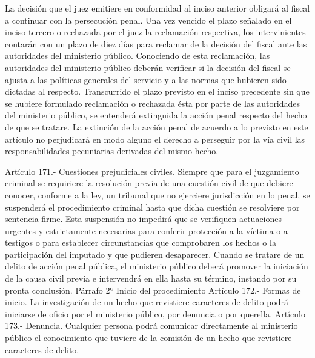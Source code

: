     La decisión que el juez emitiere en conformidad al inciso anterior obligará al fiscal a continuar con la persecución penal.
    Una vez vencido el plazo señalado en el inciso tercero o rechazada por el juez la reclamación respectiva, los intervinientes contarán con un plazo de diez días para reclamar de la decisión del fiscal ante las autoridades del ministerio público.
    Conociendo de esta reclamación, las autoridades del ministerio público deberán verificar si la decisión del fiscal se ajusta a las políticas generales del servicio y a las normas que hubieren sido dictadas al respecto. Transcurrido el plazo previsto en el inciso precedente sin que se hubiere formulado reclamación o rechazada ésta por parte de las autoridades del ministerio público, se entenderá extinguida la acción penal respecto del hecho de que se tratare.
    La extinción de la acción penal de acuerdo a lo previsto en este artículo no perjudicará en modo alguno el derecho a perseguir por la vía civil las responsabilidades pecuniarias derivadas del mismo hecho.

    Artículo 171.- Cuestiones prejudiciales civiles. Siempre que para el juzgamiento criminal se requiriere la resolución previa de una cuestión civil de que debiere conocer, conforme a la ley, un tribunal que no ejerciere jurisdicción en lo penal, se suspenderá el procedimiento criminal hasta que dicha cuestión se resolviere por sentencia firme.
    Esta suspensión no impedirá que se verifiquen actuaciones urgentes y estrictamente necesarias para conferir protección a la víctima o a testigos o para establecer circunstancias que comprobaren los hechos o la participación del imputado y que pudieren desaparecer.
    Cuando se tratare de un delito de acción penal pública, el ministerio público deberá promover la iniciación de la causa civil previa e intervendrá en ella hasta su término, instando por su pronta conclusión.
    Párrafo 2º Inicio del procedimiento
    Artículo 172.- Formas de inicio. La investigación de un hecho que revistiere caracteres de delito podrá iniciarse de oficio por el ministerio público, por denuncia o por querella.
    Artículo 173.- Denuncia. Cualquier persona podrá comunicar directamente al ministerio público el conocimiento que tuviere de la comisión de un hecho que revistiere caracteres de delito.

